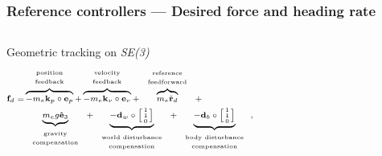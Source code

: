 \documentclass[aspectratio=169,9pt]{beamer}
\begin{document}
\begin{frame}
\frametitle{Reference controllers --- Desired force and heading rate}

\begin{columns}[c]


\begin{block}{\small Geometric tracking on \emph{SE(3)} \cite{lee2010geometric}}
  \begin{equation}
    \scriptsize
    \begin{split}
      \mathbf{f}_d = &\overbrace{-m_e\mathbf{k}_p\circ \mathbf{e}_p}^{\begin{tabular}{c}
        \tiny position\\
        \tiny feedback
      \end{tabular}} + \overbrace{-m_e\mathbf{k}_v\circ \mathbf{e}_v}^{\begin{tabular}{c}
        \tiny velocity\\
        \tiny feedback
      \end{tabular}} + \overbrace{m_e\ddot{\mathbf{r}}_d}^{\begin{tabular}{c}
        \tiny reference\\
        \tiny feedforward
      \end{tabular}} + \\
      & \underbrace{m_eg\mathbf{\hat{e}}_3}_{\begin{tabular}{c}
        \tiny gravity\\
        \tiny compensation
      \end{tabular}} + \underbrace{-\mathbf{d}_w\circ \left[\begin{smallmatrix}
        1\\
        1\\
        0
      \end{smallmatrix}\right]}_{\begin{tabular}{c}
        \tiny world disturbance\\
        \tiny compensation
      \end{tabular}} + \underbrace{-\mathbf{d}_b\circ \left[\begin{smallmatrix}
        1\\
        1\\
        0
      \end{smallmatrix}\right]}_{\begin{tabular}{c}
        \tiny body disturbance\\
        \tiny compensation
      \end{tabular}},
    \end{split}
  \end{equation}
\end{block}


\end{columns}
\end{frame}
\end{document}
